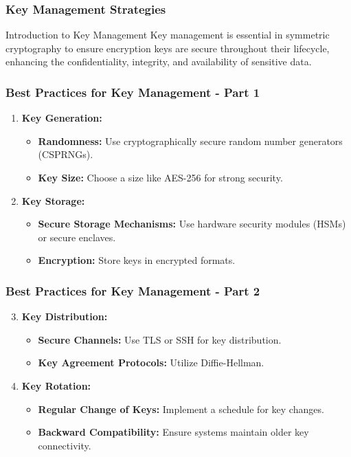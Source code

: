\documentclass{beamer}
\begin{document}
\begin{frame}
    \frametitle{Key Management Strategies}
    \begin{block}{Introduction to Key Management}
        Key management is essential in symmetric cryptography to ensure encryption keys are secure throughout their lifecycle, enhancing the confidentiality, integrity, and availability of sensitive data.
    \end{block}
\end{frame}

\begin{frame}
    \frametitle{Best Practices for Key Management - Part 1}
    \begin{enumerate}
        \item \textbf{Key Generation:}
            \begin{itemize}
                \item \textbf{Randomness:} Use cryptographically secure random number generators (CSPRNGs).
                \item \textbf{Key Size:} Choose a size like AES-256 for strong security.
            \end{itemize}
        \item \textbf{Key Storage:}
            \begin{itemize}
                \item \textbf{Secure Storage Mechanisms:} Use hardware security modules (HSMs) or secure enclaves.
                \item \textbf{Encryption:} Store keys in encrypted formats.
            \end{itemize}
    \end{enumerate}
\end{frame}

\begin{frame}[fragile]
    \frametitle{Best Practices for Key Management - Part 2}
    \begin{enumerate}
        \setcounter{enumi}{2}
        \item \textbf{Key Distribution:}
            \begin{itemize}
                \item \textbf{Secure Channels:} Use TLS or SSH for key distribution.
                \item \textbf{Key Agreement Protocols:} Utilize Diffie-Hellman.
            \end{itemize}
        \item \textbf{Key Rotation:}
            \begin{itemize}
                \item \textbf{Regular Change of Keys:} Implement a schedule for key changes.
                \item \textbf{Backward Compatibility:} Ensure systems maintain older key connectivity.
            \end{itemize}
    \end{enumerate}
\end{frame}
\end{document}
